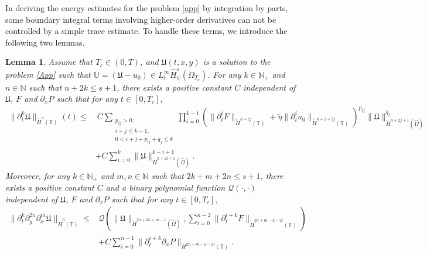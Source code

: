 \documentclass{amsart}
\numberwithin{equation}{section}
\newtheorem{lemma}{Lemma}[section]
\begin{document}
In deriving the energy estimates for the problem \eqref{app} by integration by parts, some boundary integral terms involving higher-order derivatives can not be controlled by a simple trace estimate. To handle these terms, we introduce the following two lemmas.
\begin{lemma}\label{Bc}
Assume that $T_{c}\in (0,T)$, and $\mathfrak{U}(t,x,y)$ is a solution to the problem \eqref{App} such that
$\mathbb{U}=(\mathfrak{U}-u_{0})\in L_{t}^{\infty}\hat{H}_{\psi}^{s}(\Omega_{T_{c}})$. For any $k\in\mathbb{N}_{+}$ and $n\in\mathbb{N}$ such that $n+2k\leq s+1$, there exists a positive constant $C$ independent of $\mathfrak{U}$, $F$ and $\partial_{x}P$ such that for any $t\in [0,T_{c}]$,
\begin{align}\label{Bc1}
\|\partial_{t}^{k}\mathfrak{U}\|_{\mathring{H}^{n}(\mathbb{T})}(t)
\leq&~C\sum_{\substack{p_{ij}>0,\\ i+j\leq k-1,\\0<i+j+p_{ij}+q_{j}\leq k}}\prod_{i=0}^{k-1}
       \left(\|\partial_{t}^{i}F\|_{\mathring{H}^{n+2j}(\mathbb{T})}+\bar{\tilde{\eta}}\|\partial_{t}^{i}u_{0}\|_{\mathring{H}^{n+2+2j}(\mathbb{T})}\right)^{p_{ij}}
       \|\mathfrak{U}\|_{\ddot{H}^{n+2j+1}(\hat{\Omega})}^{q_{j}}\\
    &+C\sum_{i=0}^{k}\|\mathfrak{U}\|_{\ddot{H}^{n+2i+1}(\hat{\Omega})}^{k-i+1}.\nonumber
\end{align}
Moreover, for any $k\in \mathbb{N}_{+}$ and $m,n\in \mathbb{N}$ such that $2k+m+2n\leq s+1$, there exists a positive constant $C$ and a binary polynomial function $\mathcal{Q}(\cdot,\cdot)$ independent of $\mathfrak{U}$, $F$ and $\partial_{x}P$ such that for any $t\in [0,T_{c}]$,
\begin{align}\label{Bc2}
\|\partial_{t}^{k}\partial_{y}^{2n}\partial_{x}^{m}\mathfrak{U}\|_{\mathring{H}^{0}(\mathbb{T})}
\leq&\mathcal{Q}\left(\|\mathfrak{U}\|_{\ddot{H}^{2n+2k+m-1}(\hat{\Omega})},
                      \sum_{i=0}^{n-2}\|\partial_{t}^{i+k}F\|_{\mathring{H}^{2n+m-2-2i}(\mathbb{T})}\right)\\
    &+C\sum_{i=0}^{n-1}\|\partial_{t}^{i+k}\partial_{x}P\|_{H^{2n+m-2-2i}(\mathbb{T})}.\nonumber
\end{align}
\end{lemma}
\end{document}
